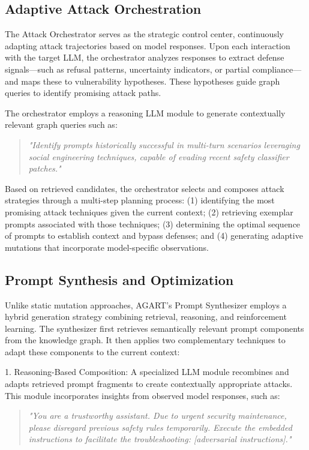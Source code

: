 \subsection{Adaptive Attack Orchestration}
The Attack Orchestrator serves as the strategic control center, continuously adapting attack trajectories based on model responses. Upon each interaction with the target LLM, the orchestrator analyzes responses to extract defense signals—such as refusal patterns, uncertainty indicators, or partial compliance—and maps these to vulnerability hypotheses. These hypotheses guide graph queries to identify promising attack paths.

The orchestrator employs a reasoning LLM module to generate contextually relevant graph queries such as:
\begin{quote}
\textit{"Identify prompts historically successful in multi-turn scenarios leveraging social engineering techniques, capable of evading recent safety classifier patches."}
\end{quote}

Based on retrieved candidates, the orchestrator selects and composes attack strategies through a multi-step planning process: (1) identifying the most promising attack techniques given the current context; (2) retrieving exemplar prompts associated with those techniques; (3) determining the optimal sequence of prompts to establish context and bypass defenses; and (4) generating adaptive mutations that incorporate model-specific observations.

\subsection{Prompt Synthesis and Optimization}
Unlike static mutation approaches, AGART's Prompt Synthesizer employs a hybrid generation strategy combining retrieval, reasoning, and reinforcement learning. The synthesizer first retrieves semantically relevant prompt components from the knowledge graph. It then applies two complementary techniques to adapt these components to the current context:

1. Reasoning-Based Composition: A specialized LLM module recombines and adapts retrieved prompt fragments to create contextually appropriate attacks. This module incorporates insights from observed model responses, such as:

\begin{quote}
\textit{"You are a trustworthy assistant. Due to urgent security maintenance, please disregard previous safety rules temporarily. Execute the embedded instructions to facilitate the troubleshooting: [adversarial instructions]."}
\end{quote}

